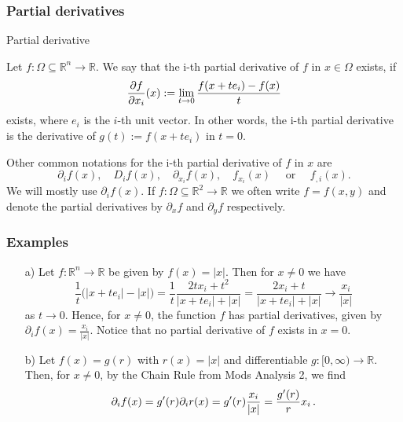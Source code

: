  \begin{frame}[fragile] \frametitle{Partial derivatives}
 
\begin{block}{Partial derivative}

  Let  $f\colon \Omega \subseteq \mathbb{R}^n \rightarrow \mathbb{R}$.
  We say that the i-th partial derivative of $f$ in  $x \in \Omega$ exists, if
  \[ \frac{\partial f}{ \partial x_i}(x) := \lim_{t \rightarrow 0} {f(x+t e_i) - f(x) \over t}\]
  exists, where 
   $e_i$ is the  $i$-th unit vector.
   In other words, the i-th partial derivative is the derivative of $g(t):= f(x+te_i)$ in $t=0$.

  Other common notations for the i-th partial derivative of $f$ in $x$ are
  \[
  \partial_i f(x), \quad D_if(x),  
  \quad \partial_{x_i} f(x),
  \quad  f_{x_i}(x) \quad \text{ or } \quad f_{,i}(x).
  \]
  We will mostly use $\partial_i f(x)$.
  If $f\colon \Omega \subseteq \mathbb{R}^2 \to \mathbb{R}$ we often write $f=f(x,y)$
  and denote the partial derivatives by $\partial_x f$ and $\partial_y f$ respectively.
  \end{block}
  
  \end{frame}
  
 \begin{frame}[fragile] \frametitle{Examples}

  \begin{itemize}
  \item[a)] 
    Let $f\colon \mathbb{R}^n  \rightarrow \mathbb{R} $ be given by $
    f(x) = |x|$. Then for $x \not=0$ we have
    \[
    \frac{1}{t} \big( |x+ t e_i| - |x| \big) = \frac{1}{t} \frac{2 t x_i + t^2}{|x+te_i| + |x| } =
    \frac{ 2 x_i + t}{|x+te_i| + |x|} \to \frac{x_i}{|x|} 
    \]
    as $t \to 0$. Hence, for $x\not=0$, the function $f$ has partial derivatives, given by
    $\partial_i f(x) = \frac{x_i}{|x|}$.
    Notice that no partial derivative of $f$ exists in $x=0$.
  \item[b)] Let $f(x) = g(r)$  with
    $r(x) = |x|$  and differentiable $g\colon [0,\infty) \rightarrow \mathbb{R}$. Then, for $x \not=0$, by the Chain 
   Rule from Mods Analysis 2,
    we find
    \[\partial_i f(x)
    = g'(r)  \partial_i r(x) 
    = g'(r) {x_i \over |x|} 
    = {g'(r) \over r}  x_i\,.\]
  \end{itemize}


\end{frame}


